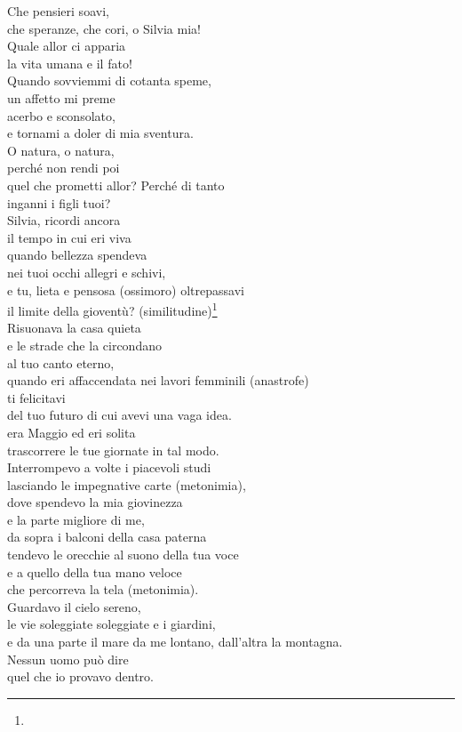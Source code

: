 \documentclass{article}
\newcommand{\notaparentesi}[1]{{\color{grigio}\textsf{(#1)}}}
\newcommand{\notamargine}[1]{\marginnote{\color{grigio}\small#1}}
\begin{document}
\begin{vwcol}[widths={0.43,0.57},justify=flush,rule=0pt,indent=0em]
Che pensieri soavi,\\
che speranze, che cori, o Silvia mia!\\
\notamargine{30.}
Quale allor ci apparia\\
la vita umana e il fato!\\
Quando sovviemmi di cotanta speme,\\
un affetto mi preme\\
acerbo e sconsolato,\\
\notamargine{35.}
e tornami a doler di mia sventura.\\
O natura, o natura,\\
perché non rendi poi\\
quel che prometti allor? Perché di tanto\\
inganni i figli tuoi?\\



Silvia, ricordi ancora\\
il tempo in cui eri viva\\
quando bellezza spendeva\\
nei tuoi occhi allegri e schivi,\\
e tu, lieta e pensosa \notaparentesi{ossimoro} oltrepassavi\\
il limite della gioventù? \notaparentesi{similitudine}\footnote[1]{}\\

Risuonava la casa quieta\\
e le strade che la circondano\\
al tuo canto eterno,\\
quando eri affaccendata nei lavori femminili \notaparentesi{anastrofe}\\
ti felicitavi\\
del tuo futuro di cui avevi una vaga idea.\\
era Maggio ed eri solita\\
trascorrere le tue giornate in tal modo.\\

Interrompevo a volte i piacevoli studi\\
lasciando le impegnative carte \notaparentesi{metonimia},\\
dove spendevo la mia giovinezza\\
e la parte migliore di me,\\
da sopra i balconi della casa paterna\\
tendevo le orecchie al suono della tua voce\\
e a quello della tua mano veloce\\
che percorreva la tela \notaparentesi{metonimia}.\\
Guardavo il cielo sereno,\\
le vie soleggiate soleggiate e i giardini,\\
e da una parte il mare da me lontano, dall'altra la montagna.\\
Nessun uomo può dire\\
quel che io provavo dentro.\\


\end{vwcol}
\end{document}
